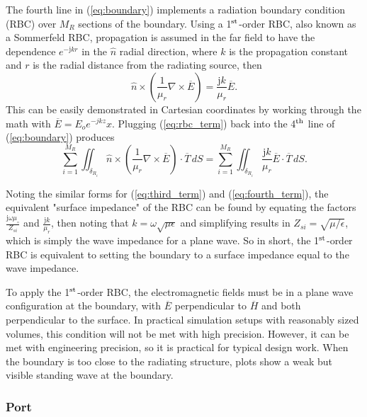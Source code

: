 \documentclass[titlepage]{article}
\renewcommand\_{\textunderscore\linebreak[1]}
\begin{document}
The fourth line in (\ref{eq:boundary}) implements a radiation boundary condition (RBC) over $M_R$ sections of the boundary.  Using a 1$^{\textnormal{st}}$-order RBC, also known as a Sommerfeld RBC, propagation is assumed in the far field to have the dependence $e^{-\text{j}kr}$ in the $\hat{n}$ radial direction, where $k$ is the propagation constant and $r$ is the radial distance from the radiating source, then  
\begin{equation}
\label{eq:rbc_term}
\hat{n}\times(\frac{1}{\mu_r}\nabla\times\overline{E})=\frac{\text{j}k}{\mu_r}\overline{E}.
\end{equation}
This can be easily demonstrated in Cartesian coordinates by working through the math with $\overline{E}=E_o e^{-jkz}\hat{x}$. Plugging (\ref{eq:rbc_term}) back into the 4$^{\textnormal{th}}$ line of (\ref{eq:boundary}) produces
\begin{equation}
\label{eq:fourth_term}
\sum_{i=1}^{M_R}\iint_{\delta_{R_{i}}}\hat{n}\times(\frac{1}{\mu_r}\nabla\times\overline{E})\cdot\overline{T}\,dS=\sum_{i=1}^{M_R}\iint_{\delta_{R_{i}}}\frac{\text{j}k}{\mu_r}\overline{E}\cdot\overline{T}\,dS.
\end{equation}

Noting the similar forms for (\ref{eq:third_term}) and (\ref{eq:fourth_term}), the equivalent "surface impedance" of the RBC can be found by equating the factors $\frac{\text{j}\omega\mu_{\circ}}{Z_{si}}$ and $\frac{\text{j}k}{\mu_r}$, then noting that $k=\omega\sqrt{\mu\epsilon}$ and simplifying results in $Z_{si}=\sqrt{\mu/\epsilon}$, which is simply the wave impedance for a plane wave.  So in short, the 1$^{\textnormal{st}}$-order RBC is equivalent to setting the boundary to a surface impedance equal to the wave impedance.

To apply the 1$^{\textnormal{st}}$-order RBC, the electromagnetic fields must be in a plane wave configuration at the boundary, with $\overline{E}$ perpendicular to $\overline{H}$ and both perpendicular to the surface.  In practical simulation setups with reasonably sized volumes, this condition will not be met with high precision.  However, it can be met with engineering precision, so it is practical for typical design work.  When the boundary is too close to the radiating structure, plots show a weak but visible standing wave at the boundary.

\subsubsection{Port}
\label{sec:port}
\end{document}

